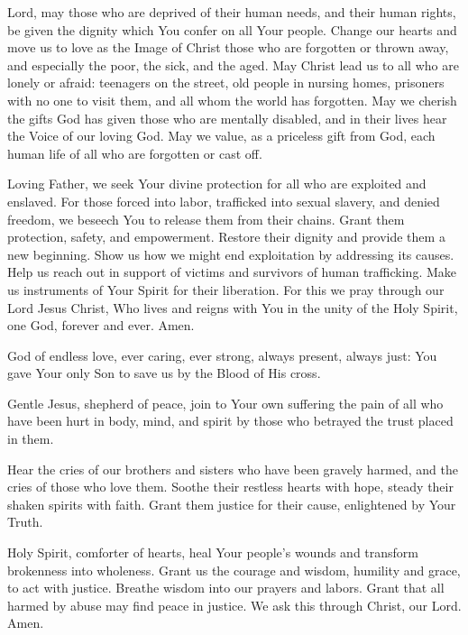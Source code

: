 \label{prayer:marginalized}
Lord, may those who are deprived of their human needs, and their human rights, be given the dignity which You confer on all Your people.
Change our hearts and move us to love as the Image of Christ those who are forgotten or thrown away, and especially the poor, the sick, and the aged.
May Christ lead us to all who are lonely or afraid: teenagers on the street, old people in nursing homes, prisoners with no one to visit them, and all whom the world has forgotten.
May we cherish the gifts God has given those who are mentally disabled,
and in their lives hear the Voice of our loving God.
May we value, as a priceless gift from God, each human life of all who are forgotten or cast off.

\label{prayer:trafficking}
Loving Father, we seek Your divine protection for all who are exploited and enslaved.
For those forced into labor, trafficked into sexual slavery, and denied freedom,
we beseech You to release them from their chains.
Grant them protection, safety, and empowerment.
Restore their dignity and provide them a new beginning.
Show us how we might end exploitation by addressing its causes.
Help us reach out in support of victims and survivors of human trafficking.
Make us instruments of Your Spirit for their liberation.
For this we pray through our Lord Jesus Christ, Who lives and reigns with You in the unity of the Holy Spirit, one God, forever and ever.
Amen.

\label{prayer:healing_victims_abuse}
God of endless love, ever caring, ever strong, always present, always just:
You gave Your only Son to save us by the Blood of His cross.

Gentle Jesus, shepherd of peace, join to Your own suffering the pain of all who have been hurt in body, mind, and spirit by those who betrayed the trust placed in them.

Hear the cries of our brothers and sisters who have been gravely harmed, and the cries of those who love them.
Soothe their restless hearts with hope, steady their shaken spirits with faith.
Grant them justice for their cause, enlightened by Your Truth.

Holy Spirit, comforter of hearts, heal Your people's wounds and transform brokenness into wholeness.
Grant us the courage and wisdom, humility and grace, to act with justice.
Breathe wisdom into our prayers and labors.
Grant that all harmed by abuse may find peace in justice.
We ask this through Christ, our Lord. Amen.

